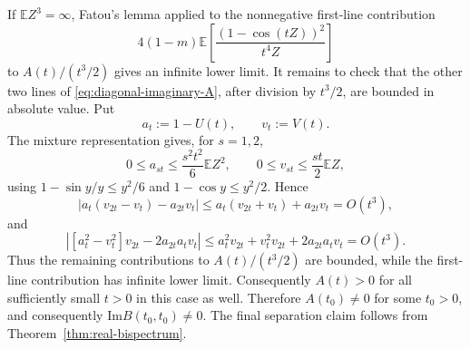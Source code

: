 \documentclass[aap,press]{apt} \volno{00} \partno{00}
\newcommand{\E}{\mathbb{E}}
\newcommand{\1}{\mathbf{1}}
\newcommand{\Imm}{\mathrm{Im}}
\numberwithin{equation}{section}
\begin{document}
If $\E Z^3=\infty$, Fatou's lemma applied to the nonnegative first-line contribution
\[
4(1-m)\E\left[\frac{(1-\cos(tZ))^2}{t^4Z}\right]
\]
to $A(t)/(t^3/2)$ gives an infinite lower limit. It remains to check that the other two lines of \eqref{eq:diagonal-imaginary-A}, after division by $t^3/2$, are bounded in absolute value. Put
\[
a_t:=1-U(t),\qquad v_t:=V(t).
\]
The mixture representation gives, for $s=1,2$,
\[
0\le a_{st}\le \frac{s^2t^2}{6}\E Z^2,
\qquad
0\le v_{st}\le \frac{st}{2}\E Z,
\]
using $1-\sin y/y\le y^2/6$ and $1-\cos y\le y^2/2$. Hence
\[
|a_t(v_{2t}-v_t)-a_{2t}v_t|
\le a_t(v_{2t}+v_t)+a_{2t}v_t=O(t^3),
\]
and
\[
|[a_t^2-v_t^2]v_{2t}-2a_{2t}a_tv_t|
\le a_t^2v_{2t}+v_t^2v_{2t}+2a_{2t}a_tv_t=O(t^3).
\]
Thus the remaining contributions to $A(t)/(t^3/2)$ are bounded, while the first-line contribution has infinite lower limit. Consequently $A(t)>0$ for all sufficiently small $t>0$ in this case as well. Therefore $A(t_0)\neq0$ for some $t_0>0$, and consequently $\Imm B(t_0,t_0)\neq0$. The final separation claim follows from Theorem~\ref{thm:real-bispectrum}.
\end{document}
